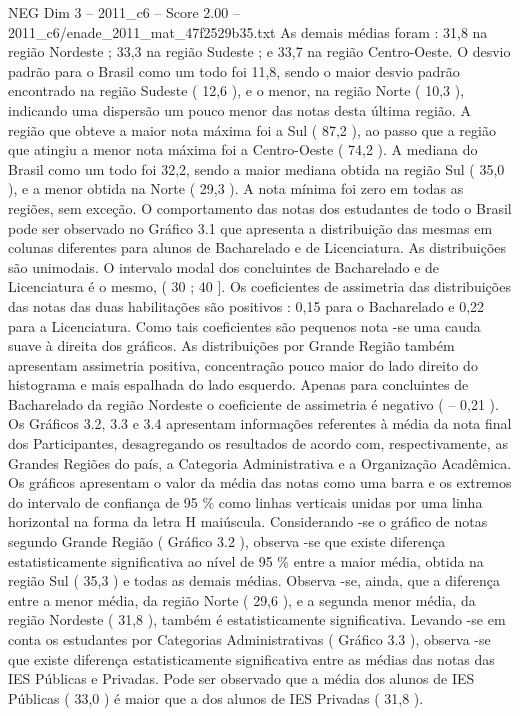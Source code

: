 \begin{textsample}{NEG Dim 3 – 2011\_c6 – Score 2.00 – 2011\_c6/enade\_2011\_mat\_47f2529b35.txt}
As demais médias foram : 31,8 na região Nordeste ; 33,3 na região Sudeste ; e 33,7 na região Centro-Oeste.
O desvio padrão para o Brasil como um todo foi 11,8, sendo o maior desvio padrão encontrado na região Sudeste ( 12,6 ), e o menor, na região Norte ( 10,3 ), indicando uma dispersão um pouco menor das notas desta última região.
A região que obteve a maior nota máxima foi a Sul ( 87,2 ), ao passo que a região que atingiu a menor nota máxima foi a Centro-Oeste ( 74,2 ).
A mediana do Brasil como um todo foi 32,2, sendo a maior mediana obtida na região Sul ( 35,0 ), e a menor obtida na Norte ( 29,3 ).
A nota mínima foi zero em todas as regiões, sem exceção.
O comportamento das notas dos estudantes de todo o Brasil pode ser observado no Gráfico 3.1 que apresenta a distribuição das mesmas em colunas diferentes para alunos de Bacharelado e de Licenciatura.
As distribuições são unimodais.
O intervalo modal dos concluintes de Bacharelado e de Licenciatura é o mesmo, ( 30 ; 40 ].
Os coeficientes de assimetria das distribuições das notas das duas habilitações são positivos : 0,15 para o Bacharelado e 0,22 para a Licenciatura.
Como tais coeficientes são pequenos nota -se uma cauda suave à direita dos gráficos.
As distribuições por Grande Região também apresentam assimetria positiva, concentração pouco maior do lado direito do histograma e mais espalhada do lado esquerdo.
Apenas para concluintes de Bacharelado da região Nordeste o coeficiente de assimetria é negativo ( – 0,21 ).
Os Gráficos 3.2, 3.3 e 3.4 apresentam informações referentes à média da nota final dos Participantes, desagregando os resultados de acordo com, respectivamente, as Grandes Regiões do país, a Categoria Administrativa e a Organização Acadêmica.
Os gráficos apresentam o valor da média das notas como uma barra e os extremos do intervalo de confiança de 95 \% como linhas verticais unidas por uma linha horizontal na forma da letra H maiúscula.
Considerando -se o gráfico de notas segundo Grande Região ( Gráfico 3.2 ), observa -se que existe diferença estatisticamente significativa ao nível de 95 \% entre a maior média, obtida na região Sul ( 35,3 ) e todas as demais médias.
Observa -se, ainda, que a diferença entre a menor média, da região Norte ( 29,6 ), e a segunda menor média, da região Nordeste ( 31,8 ), também é estatisticamente significativa.
Levando -se em conta os estudantes por Categorias Administrativas ( Gráfico 3.3 ), observa -se que existe diferença estatisticamente significativa entre as médias das notas das IES Públicas e Privadas.
Pode ser observado que a média dos alunos de IES Públicas ( 33,0 ) é maior que a dos alunos de IES Privadas ( 31,8 ).

\end{textsample}
